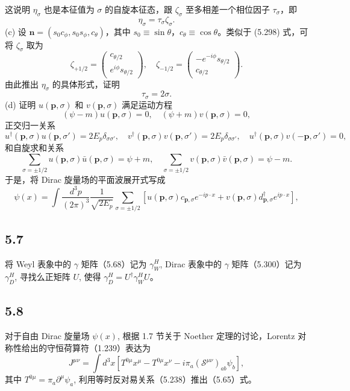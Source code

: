 这说明 $\eta_\sigma$ 也是本征值为 $\sigma$ 的自旋本征态，跟 $\zeta_\sigma$ 至多相差一个相位因子 $\tau_\sigma$，即
$$\eta_\sigma = \tau_\sigma \zeta_\sigma. \tag{5.308}$$
(c) 设 $\mathbf{n} = (s_0 c_\phi, s_0 s_\phi, c_\theta)$，其中 $s_0 \equiv \sin \theta$，$c_\theta \equiv \cos \theta$。类似于 (5.298) 式，可将 $\zeta_\sigma$ 取为
$$\zeta_{+1/2} = \begin{pmatrix}
c_{\theta/2} \\
e^{i\phi} s_{\theta/2}
\end{pmatrix}, \quad \zeta_{-1/2} = \begin{pmatrix}
-e^{-i\phi} s_{\theta/2} \\
c_{\theta/2}
\end{pmatrix}. \tag{5.309}$$
由此推出 $\eta_\sigma$ 的具体形式，证明
$$\tau_\sigma = 2\sigma. \tag{5.310}$$
(d) 证明 $u(\mathbf{p}, \sigma)$ 和 $v(\mathbf{p}, \sigma)$ 满足运动方程
$$(\psi - m) u(\mathbf{p}, \sigma) = 0, \quad (\psi + m) v(\mathbf{p}, \sigma) = 0, \tag{5.311}$$
正交归一关系
$$u^\dagger (\mathbf{p}, \sigma) u(\mathbf{p}, \sigma') = 2E_p \delta_{\sigma \sigma'}, \quad v^\dagger (\mathbf{p}, \sigma) v(\mathbf{p}, \sigma') = 2E_p \delta_{\sigma \sigma'}, \quad u^\dagger (\mathbf{p}, \sigma) v(-\mathbf{p}, \sigma') = 0, \tag{5.312}$$
和自旋求和关系
$$\sum_{\sigma = \pm 1/2} u(\mathbf{p}, \sigma) \bar{u}(\mathbf{p}, \sigma) = \psi + m, \quad \sum_{\sigma = \pm 1/2} v(\mathbf{p}, \sigma) \bar{v}(\mathbf{p}, \sigma) = \psi - m. \tag{5.313}$$
于是，将 Dirac 旋量场的平面波展开式写成
$$\psi(x) = \int \frac{d^3 p}{(2\pi)^3} \frac{1}{\sqrt{2E_p}} \sum_{\sigma = \pm 1/2} [u(\mathbf{p}, \sigma) c_{\mathbf{p}, \sigma} e^{-ip \cdot x} + v(\mathbf{p}, \sigma) d_{\mathbf{p}, \sigma}^\dagger e^{ip \cdot x}], \tag{5.314}$$

\newpage
\subsection{5.7}
将 Weyl 表象中的 $\gamma$ 矩阵（5.68）记为 $\gamma_W^H$, Dirac 表象中的 $\gamma$ 矩阵（5.300）记为 $\gamma_D^H$, 寻找么正矩阵 $U$, 使得 $\gamma_D^H = U^\dagger \gamma_W^H U$。

\newpage
\subsection{5.8}
对于自由 Dirac 旋量场 $\psi(x)$, 根据 1.7 节关于 Noether 定理的讨论，Lorentz 对称性给出的守恒荷算符（1.239）表达为
$$J^{\mu \nu} = \int d^3 x [T^{0 \mu} x^{\mu} - T^{0 \mu} x^{\nu} - i \pi_a (\mathcal{S}^{\mu \nu})_{ab} \psi_b],$$
其中 $T^{0 \mu} = \pi_a \partial^{\mu} \psi_a$, 利用等时反对易关系（5.238）推出（5.65）式。

